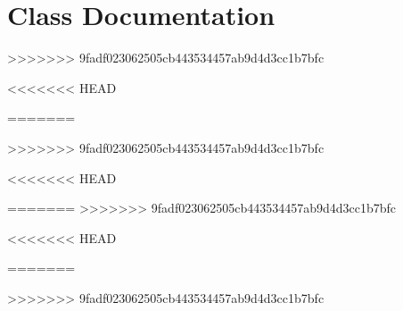 \documentclass[twoside]{book}
\newcommand{\+}{\discretionary{\mbox{\scriptsize$\hookleftarrow$}}{}{}}
\begin{document}
\chapter{Class Documentation}

>>>>>>> 9fadf023062505cb443534457ab9d4d3cc1b7bfc




<<<<<<< HEAD






=======

>>>>>>> 9fadf023062505cb443534457ab9d4d3cc1b7bfc
















<<<<<<< HEAD

=======
>>>>>>> 9fadf023062505cb443534457ab9d4d3cc1b7bfc




<<<<<<< HEAD




=======

>>>>>>> 9fadf023062505cb443534457ab9d4d3cc1b7bfc










\end{document}
